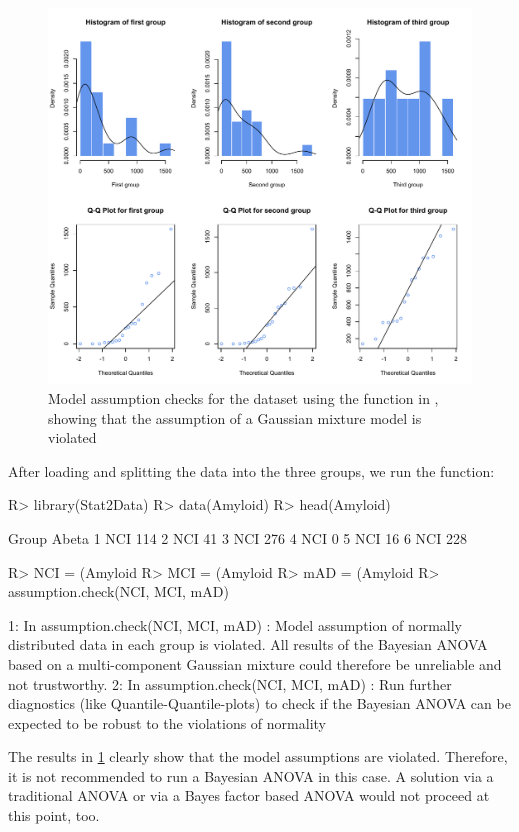 \begin{figure}[h!]
\centering
\includegraphics[width=1\textwidth]{histAlzheimer}
\caption{Model assumption checks for the  dataset using the  function in , showing that the assumption of a Gaussian mixture model is violated}
\label{fig:histAlzheimer}
\end{figure}
After loading and splitting the data into the three groups, we run the  function:
\begin{example}
R> library(Stat2Data)
R> data(Amyloid)
R> head(Amyloid)

  Group Abeta
1   NCI   114
2   NCI    41
3   NCI   276
4   NCI     0
5   NCI    16
6   NCI   228

R> NCI = (Amyloid %
R> MCI = (Amyloid %
R> mAD = (Amyloid %
R> assumption.check(NCI, MCI, mAD)

1: In assumption.check(NCI, MCI, mAD) :
  Model assumption of normally distributed data in each group is violated.
 All results of the Bayesian ANOVA based on a multi-component Gaussian 
 mixture could therefore be unreliable and not trustworthy.
2: In assumption.check(NCI, MCI, mAD) :
  Run further diagnostics (like Quantile-Quantile-plots) to check if the 
  Bayesian ANOVA can be expected to be robust to the violations of normality	
\end{example}
The results in  \ref{fig:histAlzheimer} clearly show that the model assumptions are violated. Therefore, it is not recommended to run a Bayesian ANOVA in this case. A solution via a traditional ANOVA or via a Bayes factor based ANOVA would not proceed at this point, too.

